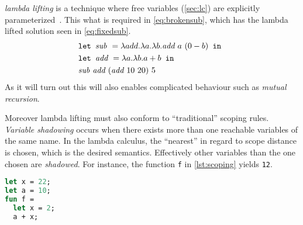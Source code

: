 \textit{lambda lifting} is a technique where free variables (\autoref{sec:lc}) are explicitly parameterized~\cite{johnsson1985lambda}.
This what is required in \autoref{eq:brokensub}, which has the lambda lifted solution seen in \autoref{eq:fixedsub}.
\begin{align}
  &\texttt{let } \textit{sub } = \lambda add.\lambda a.\lambda b.\textit{add } a \,\,(0 - b) \texttt{ in } \label{eq:fixedsub}\\&\texttt{let } \textit{add } = \lambda a.\lambda b.a+b \texttt{ in } \tag*{}\\&\textit{sub } \textit{add } (\textit{add } 10 \,\, 20) \,\, 5\tag*{}
\end{align}
As it will turn out this will also enables complicated behaviour such as \textit{mutual recursion}.

Moreover lambda lifting must also conform to ``traditional'' scoping rules.
\textit{Variable shadowing} occurs when there exists more than one reachable variables of the same name.
In the lambda calculus, the ``nearest'' in regard to scope distance is chosen, which is the desired semantics.
Effectively other variables than the one chosen are \textit{shadowed}.
For instance, the function \texttt{f} in \autoref{lst:scoping} yields \texttt{12}.
\begin{lstlisting}[language=ML,caption={Scoping rules in programming languages},label={lst:scoping}]
let x = 22;
let a = 10;
fun f = 
  let x = 2;
  a + x;
\end{lstlisting}

